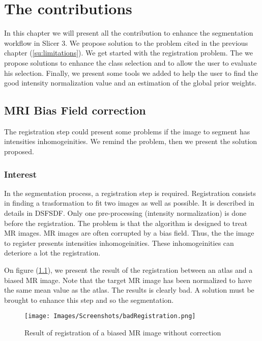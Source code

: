 \chapter{The contributions}\label{sec:contributions}
In this chapter we will present all the contribution to enhance the segmentation workflow in Slicer 3. We propose solution to the problem cited in the previous chapter (\ref{su:limitations}). We get started with the registration problem. The we propose solutions to enhance the class selection and to allow the user to evaluate his selection. Finally, we present some tools we added to help the user to find the good intensity normalization value and an estimation of the global prior weights.
%
\section{MRI Bias Field correction}

The registration step could present some problems if the image to segment has intensities inhomogeinities. We remind the problem, then we present the solution proposed.

\subsection{Interest}

In the segmentation process, a registration step is required. Registration consists in finding a trasformation to fit two images as well as possible. It is described in details in DSFSDF. Only one pre-processing (intensity normalization) is done before the registration. The problem is that the algorithm is designed to treat MR images. MR images are often corrupted by a bias field. Thus, the the image to register presents intensities inhomogeinities. These inhomogeinities can deteriore a lot the registration.
\par
On figure (\ref{fig:bfexemple}), we present the result of the registration between an atlas and a biased MR image. Note that the target MR image has been normalized to have the same mean value as the atlas. The results is clearly bad. A solution must be brought to enhance this step and so the segmentation.

  \begin{figure}[ht]\centering
  \texttt{[image: Images/Screenshots/badRegistration.png]}
  \caption{Result of registration of a biased MR image without correction}\label{fig:bfexemple}
  \end{figure}
  

